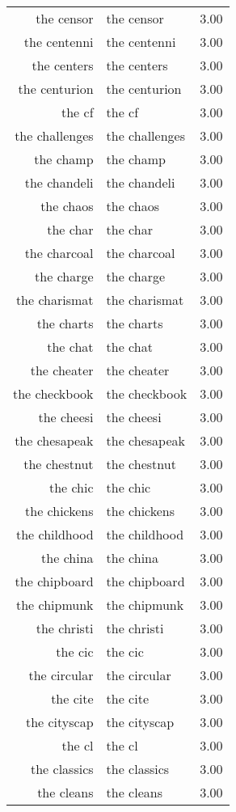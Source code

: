 \begin{table}[ht]
\begin{tabular}{rlr}
  the censor & the censor & 3.00 \\ 
  the centenni & the centenni & 3.00 \\ 
  the centers & the centers & 3.00 \\ 
  the centurion & the centurion & 3.00 \\ 
  the cf & the cf & 3.00 \\ 
  the challenges & the challenges & 3.00 \\ 
  the champ & the champ & 3.00 \\ 
  the chandeli & the chandeli & 3.00 \\ 
  the chaos & the chaos & 3.00 \\ 
  the char & the char & 3.00 \\ 
  the charcoal & the charcoal & 3.00 \\ 
  the charge & the charge & 3.00 \\ 
  the charismat & the charismat & 3.00 \\ 
  the charts & the charts & 3.00 \\ 
  the chat & the chat & 3.00 \\ 
  the cheater & the cheater & 3.00 \\ 
  the checkbook & the checkbook & 3.00 \\ 
  the cheesi & the cheesi & 3.00 \\ 
  the chesapeak & the chesapeak & 3.00 \\ 
  the chestnut & the chestnut & 3.00 \\ 
  the chic & the chic & 3.00 \\ 
  the chickens & the chickens & 3.00 \\ 
  the childhood & the childhood & 3.00 \\ 
  the china & the china & 3.00 \\ 
  the chipboard & the chipboard & 3.00 \\ 
  the chipmunk & the chipmunk & 3.00 \\ 
  the christi & the christi & 3.00 \\ 
  the cic & the cic & 3.00 \\ 
  the circular & the circular & 3.00 \\ 
  the cite & the cite & 3.00 \\ 
  the cityscap & the cityscap & 3.00 \\ 
  the cl & the cl & 3.00 \\ 
  the classics & the classics & 3.00 \\ 
  the cleans & the cleans & 3.00 \\ 

\end{tabular}
\end{table}
